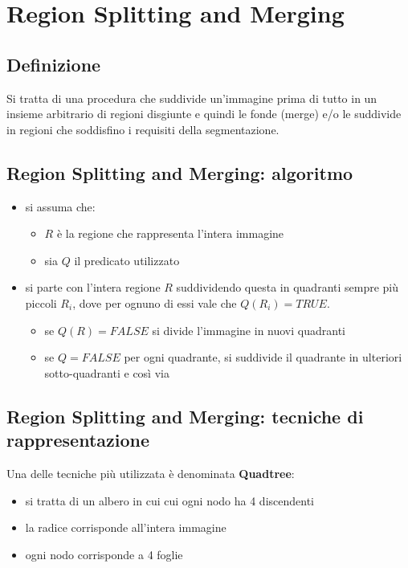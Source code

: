 \section{Region Splitting and Merging}
\subsection{Definizione}
Si tratta di una procedura che suddivide un'immagine prima di tutto in un insieme arbitrario di regioni disgiunte e quindi le fonde (merge) e/o le suddivide in regioni che soddisfino i requisiti della segmentazione.

\subsection{Region Splitting and Merging: algoritmo}
\begin{itemize}
	\item si assuma che:
	\begin{itemize}
		\item $R$ è la regione che rappresenta l'intera immagine
		\item sia $Q$ il predicato utilizzato
	\end{itemize}
	
	\item si parte con l'intera regione $R$ suddividendo questa in quadranti sempre più piccoli $R_i$, dove per ognuno di essi vale che $Q(R_i) = TRUE$. 
	\begin{itemize}
		\item se $Q(R) = FALSE$ si divide l'immagine in nuovi quadranti
		\item se $Q = FALSE$ per ogni quadrante, si suddivide il quadrante in ulteriori sotto-quadranti e così via
	\end{itemize}
	
\end{itemize}

\subsection{Region Splitting and Merging: tecniche di rappresentazione}

Una delle tecniche più utilizzata è denominata \textbf{Quadtree}:

\begin{itemize}
	\item si tratta di un albero in cui cui ogni nodo ha 4 discendenti
	\item la radice corrisponde all'intera immagine
	\item ogni nodo corrisponde a 4 foglie
\end{itemize}

